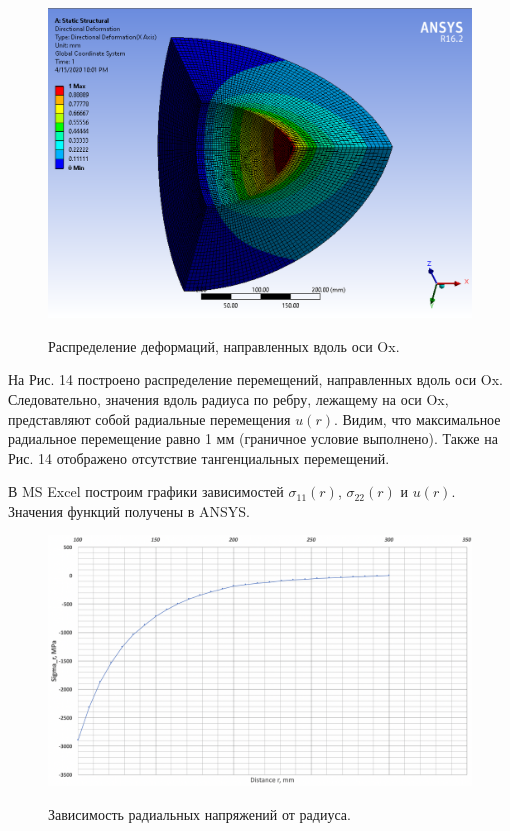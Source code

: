 \documentclass[a4paper,12pt]{article}	%
\begin{document}
\begin{figure}[H]
  \centering
  \includegraphics[scale=0.45]{img/Results_Deform_X_Axis.png}\\
  \caption{Распределение деформаций, направленных вдоль оси Ox.}
  \label{fig_14}
\end{figure}
На Рис. 14 построено распределение перемещений, направленных вдоль оси Ox. Следовательно, значения вдоль радиуса по ребру, лежащему на оси Ox, представляют собой радиальные перемещения $u(r)$. Видим, что максимальное радиальное перемещение равно 1 мм (граничное условие выполнено). Также на Рис. 14 отображено отсутствие тангенциальных перемещений.

В MS Excel построим графики зависимостей $\sigma_{11}(r)$, $\sigma_{22}(r)$ и $u(r)$. Значения функций получены в ANSYS.

\begin{figure}[H]
  \centering
  \includegraphics[scale=0.5]{img/Sigma_r_2.png}\\
  \caption{Зависимость радиальных напряжений от радиуса.}
  \label{fig_15}
\end{figure}
\end{document}
